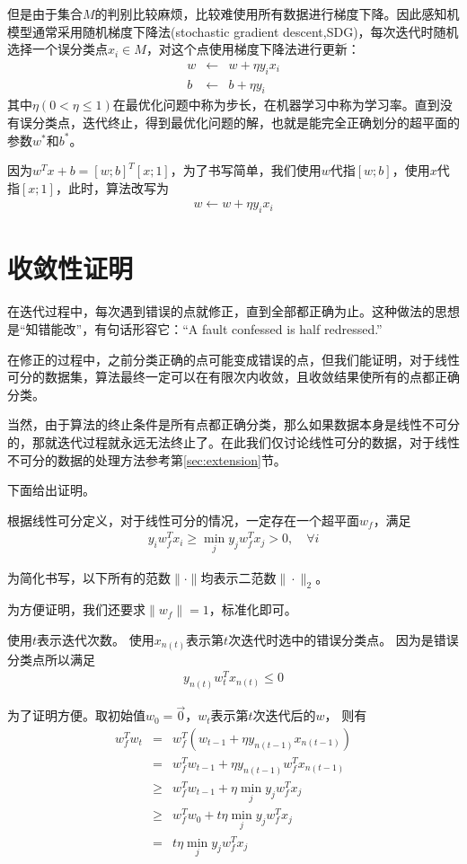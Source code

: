 \documentclass[a4paper,8pt]{article}
\begin{document}
但是由于集合$M$的判别比较麻烦，比较难使用所有数据进行梯度下降。因此感知机模型通常采用随机梯度下降法(stochastic gradient descent,SDG)，每次迭代时随机选择一个误分类点$x_i \in M$，对这个点使用梯度下降法进行更新：
\begin{eqnarray}
w & \leftarrow & w + \eta y_i x_i \\
b & \leftarrow & b + \eta y_i
\end{eqnarray}
其中$\eta(0< \eta\le 1)$在最优化问题中称为步长，在机器学习中称为学习率。直到没有误分类点，迭代终止，得到最优化问题的解，也就是能完全正确划分的超平面的参数$w^*$和$b^*$。

因为$w^T x + b = [w;b]^T [x;1]$，为了书写简单，我们使用$w$代指$[w;b]$，使用$x$代指$[x;1]$，此时，算法改写为
\begin{eqnarray}
w \leftarrow w + \eta y_i x_i
\end{eqnarray}

\section{收敛性证明}
\label{sec:proof}

在迭代过程中，每次遇到错误的点就修正，直到全部都正确为止。这种做法的思想是“知错能改”，有句话形容它：“A fault confessed is half redressed.”

在修正的过程中，之前分类正确的点可能变成错误的点，但我们能证明，对于线性可分的数据集，算法最终一定可以在有限次内收敛，且收敛结果使所有的点都正确分类。

当然，由于算法的终止条件是所有点都正确分类，那么如果数据本身是线性不可分的，那就迭代过程就永远无法终止了。在此我们仅讨论线性可分的数据，对于线性不可分的数据的处理方法参考第\ref{sec:extension}节。

下面给出证明。

根据线性可分定义，对于线性可分的情况，一定存在一个超平面$w_f$，满足
\begin{eqnarray}
y_i w_f^T x_i \ge \min_j y_j w_f^T x_j > 0, \quad \forall i
\end{eqnarray}

为简化书写，以下所有的范数$\|\cdot\|$均表示二范数$\|\cdot\|_2$。

为方便证明，我们还要求$\|w_f\|=1$，标准化即可。

使用$t$表示迭代次数。
使用$x_{n(t)}$表示第$t$次迭代时选中的错误分类点。
因为是错误分类点所以满足
\begin{eqnarray}
y_{n(t)} w_t^T x_{n(t)} \le 0
\end{eqnarray}

为了证明方便。取初始值$w_0=\vec{0}$，$w_t$表示第$t$次迭代后的$w$，
则有
\begin{eqnarray}
w_f^T w_t & = & w_f^T (w_{t-1} + \eta y_{n(t-1)} x_{n(t-1)}) \\
& = & w_f^T w_{t-1} + \eta y_{n(t-1)} w_f^T x_{n(t-1)} \\
& \ge & w_f^T w_{t-1} + \eta \min_j y_j w_f^T x_j \\
& \ge & w_f^T w_{0} + t \eta \min_j y_j w_f^T x_j \\
& = & t \eta \min_j y_j w_f^T x_j
\end{eqnarray}
\end{document}
